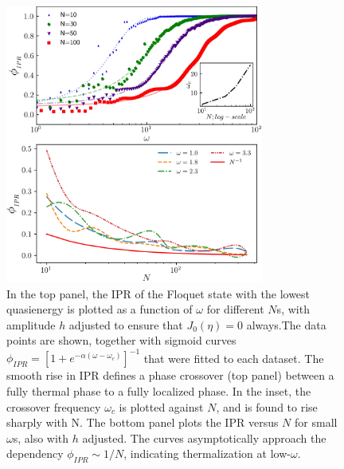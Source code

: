 \documentclass[%
reprint,
superscriptaddress,
amsmath,amssymb,
aps,
prb,
showkeys,
]{revtex4-2}
\begin{document}
	\begin{figure}[t!]
		\centering
		\includegraphics[width =8.5cm]{phase_crossover_LMG.jpeg}
		\caption{In the top panel, the IPR of the Floquet state with the lowest quasienergy is plotted as a function of $\omega$ for different $N$s, with amplitude $h$ adjusted to ensure that $J_0(\eta)=0$ always.The data points are shown, together with sigmoid curves $\phi_{IPR}=\left[1+e^{-\alpha\left(\omega-\omega_c\right)}\right]^{-1}$ that were fitted to each dataset. The smooth rise in IPR defines a phase crossover (top panel) between a fully thermal phase to a fully localized phase. In the inset, the crossover frequency $\omega_c$ is plotted against $N$, and  is found to rise sharply with N. The bottom panel plots the IPR versus $N$ for small $\omega$s, also with $h$ adjusted. The curves asymptotically approach the dependency $\phi_{IPR}\sim 1/N$, indicating thermalization at low-$\omega$.}
		\label{fig:phase_crossover}
	\end{figure}
\end{document}
